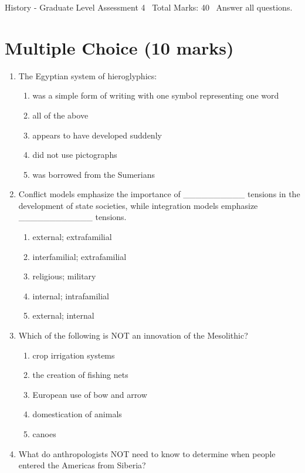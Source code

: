 \documentclass[12pt]{article}
\begin{document}
\begin{center}
History - Graduate Level Assessment 4 \
Total Marks: 40 \
Answer all questions.
\end{center}

\section*{Multiple Choice (10 marks)}
\begin{enumerate}[label=\arabic*.]
\item The Egyptian system of hieroglyphics:
\begin{enumerate}[label=(\alph*)]
    \item was a simple form of writing with one symbol representing one word
    \item all of the above
    \item appears to have developed suddenly
    \item did not use pictographs
    \item was borrowed from the Sumerians
\end{enumerate}
\item Conflict models emphasize the importance of \_\_\_\_\_\_\_\_\_\_ tensions in the development of state societies, while integration models emphasize \_\_\_\_\_\_\_\_\_\_\_\_ tensions.
\begin{enumerate}[label=(\alph*)]
    \item external; extrafamilial
    \item interfamilial; extrafamilial
    \item religious; military
    \item internal; intrafamilial
    \item external; internal
\end{enumerate}
\item Which of the following is NOT an innovation of the Mesolithic?
\begin{enumerate}[label=(\alph*)]
    \item crop irrigation systems
    \item the creation of fishing nets
    \item European use of bow and arrow
    \item domestication of animals
    \item canoes
\end{enumerate}
\item What do anthropologists NOT need to know to determine when people entered the Americas from Siberia?

\end{enumerate}
\end{document}
